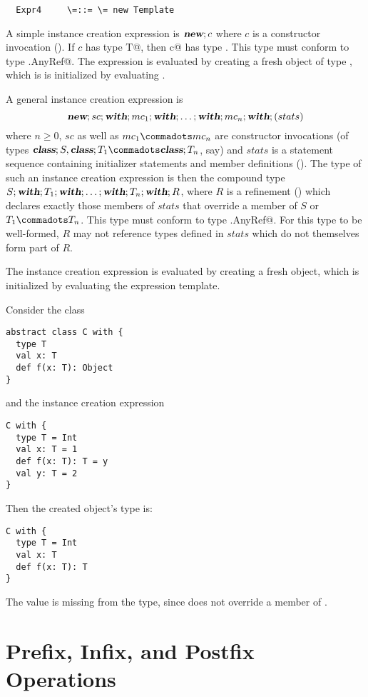 \documentclass[11pt]{report}
\begin{document}
\begin{itemize}
\syntax\begin{verbatim}
  Expr4     \=::= \= new Template
\end{verbatim}

A simple instance creation expression is $\mbox{\sl\bfseries new};c$ where $c$ is a
constructor invocation ().  If $c$ has type
\verb@class T@, then \verb@new c@ has type \verb@T@.
This type must conform to
type \verb@scala.AnyRef@.
The expression
is evaluated by creating a fresh object of type \verb@T@, which is is
initialized by evaluating \verb@c@.

A general instance creation expression is
$$\mbox{\sl\bfseries new};sc;\mbox{\sl\bfseries with};mc_1;\mbox{\sl\bfseries with};\ldots;\mbox{\sl\bfseries with};mc_n;\mbox{\sl\bfseries with};(stats)$$ where $n \geq
0$, $sc$ as well as $mc_1 \commadots mc_n$ are constructor invocations
(of types $\CLASS;S, \CLASS;T_1 \commadots \CLASS;T_n$, say) and
$stats$ is a statement sequence containing initializer statements
and member definitions (). The type of such an
instance creation expression is then the compound type
$S;\mbox{\sl\bfseries with};T_1;\mbox{\sl\bfseries with};\ldots;\mbox{\sl\bfseries with};T_n;\mbox{\sl\bfseries with};R$, where $R$ is a
refinement () which declares exactly those
members of $stats$ that override a member of $S$ or $T_1 \commadots
T_n$. This type must conform to
type \verb@scala.AnyRef@.
For this type to be well-formed, $R$ may not reference types
defined in $stats$ which do not themselves form part of $R$.

The instance creation expression is evaluated by creating a fresh
object, which is initialized by evaluating the expression template.

\example Consider the class
\begin{verbatim}
abstract class C with {
  type T
  val x: T
  def f(x: T): Object
}
\end{verbatim}
and the instance creation expression
\begin{verbatim}
C with {
  type T = Int
  val x: T = 1
  def f(x: T): T = y
  val y: T = 2
}
\end{verbatim}
Then the created object's type is:
\begin{verbatim}
C with {
  type T = Int
  val x: T
  def f(x: T): T
}
\end{verbatim}
The value \verb@y@ is missing from the type, since \verb@y@ does not
override a member of \verb@C@.

\section{Prefix, Infix, and Postfix Operations}
\label{sec:infix-operations}


\end{itemize}
\end{document}
